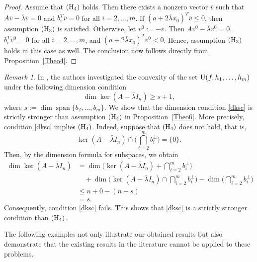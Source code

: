 \documentclass[]{interact}
\theoremstyle{plain}%
\theoremstyle{definition}
\theoremstyle{remark}
\newtheorem{remark}{Remark}
\begin{document}
	\begin{proof}
		Assume that ${\rm (H_4)}$ holds.
		Then there exists a nonzero vector $\bar v$ such that
		$A\bar v-\bar\lambda \bar v=0$ and $b_i^T\bar v=0$ for all $i=2,\ldots,m$.
		If $(a+2\bar\lambda x_0)^T\bar v\leq 0$, then assumption ${\rm (H_3)}$ is satisfied.
		Otherwise, let $v^0:=-\bar v$.
		Then
		$Av^0-\bar\lambda v^0=0$,
		$b_i^Tv^0=0$ for all $i=2,\ldots,m$,
		and $(a+2\bar\lambda x_0)^Tv^0<0$.
		Hence, assumption ${\rm (H_3)}$ holds in this case as well.
		The conclusion now follows directly from Proposition~\ref{Theo4}.
	\end{proof}
	
	
	\begin{remark}
		In \cite[Theorem~2.1]{JeyakumarLi2014}, the authors investigated the convexity of the set
		${\rm U}(f,h_1,\ldots,h_m)$ under the following dimension condition
		\begin{equation}\label{dksc}
			\dim \ker(A-\bar\lambda I_n)\geq s+1,
		\end{equation}
		where $s:=\dim \operatorname{span}\{b_2,\ldots,b_m\}$.
		We show that the dimension condition \eqref{dksc} is strictly stronger than
		assumption ${\rm (H_4)}$ in Proposition~\ref{Theo6}.
		More precisely, condition \eqref{dksc} implies ${\rm (H_4)}$.
		Indeed, suppose that ${\rm (H_4)}$ does not hold, that is,
		\[
		\ker(A-\bar\lambda I_n)\cap\Big(\bigcap_{i=2}^m b_i^\perp\Big)=\{0\}.
		\]
		Then, by the dimension formula for subspaces, we obtain
		\begin{align*}
			\dim \ker(A-\bar\lambda I_n)
			&=\dim\Big(\ker(A-\bar\lambda I_n)+\bigcap_{i=2}^m b_i^\perp\Big)\\
			&\quad+\dim\Big(\ker(A-\bar\lambda I_n)\cap\bigcap_{i=2}^m b_i^\perp\Big)
			-\dim\Big(\bigcap_{i=2}^m b_i^\perp\Big)\\
			&\leq n+0-(n-s)\\
			&=s.
		\end{align*}
		Consequently, condition \eqref{dksc} fails.
		This shows that \eqref{dksc} is a strictly stronger condition than ${\rm (H_4)}$.
	\end{remark}
	
	
	The following examples not only illustrate our obtained results but also demonstrate that
	the existing results in the literature cannot be applied to these problems.
	
\end{document}

